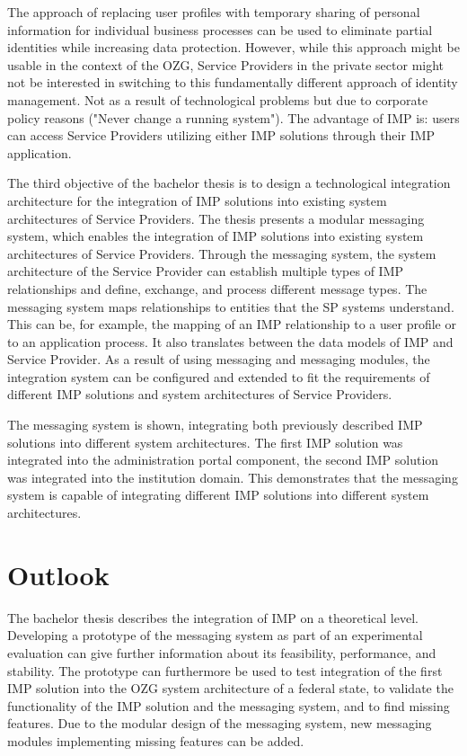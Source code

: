 The approach of replacing user profiles with temporary sharing of personal information for individual business processes can be used to eliminate partial identities while increasing data protection. However, while this approach might be usable in the context of the OZG, Service Providers in the private sector might not be interested in switching to this fundamentally different approach of identity management. Not as a result of technological problems but due to corporate policy reasons ("Never change a running system"). The advantage of IMP is: users can access Service Providers utilizing either IMP solutions through their IMP application.

The third objective of the bachelor thesis is to design a technological integration architecture for the integration of IMP solutions into existing system architectures of Service Providers. The thesis presents a modular messaging system, which enables the integration of IMP solutions into existing system architectures of Service Providers. Through the messaging system, the system architecture of the Service Provider can establish multiple types of IMP relationships and define, exchange, and process different message types. The messaging system maps relationships to entities that the SP systems understand. This can be, for example, the mapping of an IMP relationship to a user profile or to an application process. It also translates between the data models of IMP and Service Provider. As a result of using messaging and messaging modules, the integration system can be configured and extended to fit the requirements of different IMP solutions and system architectures of Service Providers.

The messaging system is shown, integrating both previously described IMP solutions into different system architectures. The first IMP solution was integrated into the administration portal component, the second IMP solution was integrated into the institution domain. This demonstrates that the messaging system is capable of integrating different IMP solutions into different system architectures.

\section{Outlook}

The bachelor thesis describes the integration of IMP on a theoretical level. Developing a prototype of the messaging system as part of an experimental evaluation can give further information about its feasibility, performance, and stability. The prototype can furthermore be used to test integration of the first IMP solution into the OZG system architecture of a federal state, to validate the functionality of the IMP solution and the messaging system, and to find missing features. Due to the modular design of the messaging system, new messaging modules implementing missing features can be added. 


